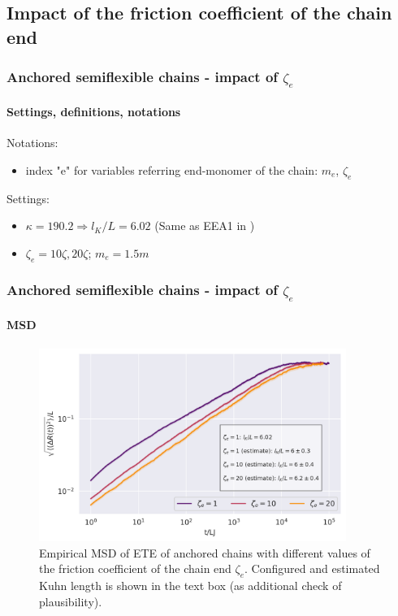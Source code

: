 \documentclass[handout]{beamer}
\begin{document}
\subsection{Impact of the friction coefficient of the chain end}


\begin{frame}
    \frametitle{Anchored semiflexible chains - impact of $\zeta_e$}
    \framesubtitle{Settings, definitions, notations}
    Notations:
    \begin{itemize}
        \item index "e" for variables referring end-monomer of the chain: $m_e$, $\zeta_e$ 
    \end{itemize}
    Settings:
    \begin{itemize}
        \item $\kappa = 190.2 \Rightarrow l_K/L=6.02$ (Same as EEA1 in \cite{Singh:2022})
        \item $\zeta_e = 10\zeta, 20\zeta$; $m_e=1.5m$
    \end{itemize}
\end{frame}


\begin{frame}
    \frametitle{Anchored semiflexible chains - impact of $\zeta_e$}
    \framesubtitle{MSD}
    \begin{figure}[h]
        \includegraphics[width=10cm]{./14+15+16-exp-msd-log.png}
        \caption{Empirical MSD of ETE of anchored chains with different values of the friction
        coefficient of the chain end $\zeta_e$. Configured and estimated Kuhn length is shown in the text
        box (as additional check of plausibility).}
    \end{figure}
\end{frame}
\end{document}
